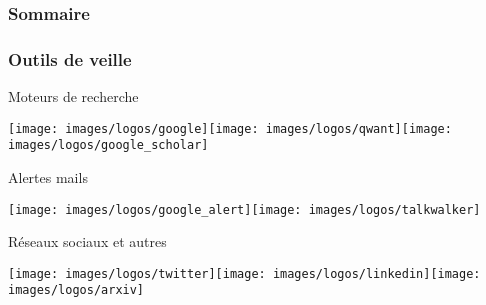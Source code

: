 \begin{frame}
	\frametitle{Sommaire}
	\tableofcontents
\end{frame}

\begin{frame}
	\frametitle{Outils de veille}
	\begin{itemize}
		\itemperso{}Moteurs de recherche\vspace*{.2cm}\newline%
		\rule{0pt}{0pt}\hfill\texttt{[image: images/logos/google]}\hspace{1cm}\texttt{[image: images/logos/qwant]}\hspace{1cm}\texttt{[image: images/logos/google\_scholar]}\hfill\rule{0pt}{0pt}
		\itemperso{}Alertes mails\vspace*{.2cm}\newline%
		\rule{0pt}{0pt}\hfill\texttt{[image: images/logos/google\_alert]}\hspace{1cm}\texttt{[image: images/logos/talkwalker]}\hfill\rule{0pt}{0pt}
		\itemperso{}Réseaux sociaux et autres\vspace*{.2cm}\newline%
		\rule{0pt}{0pt}\hfill\texttt{[image: images/logos/twitter]}\hspace{1cm}\texttt{[image: images/logos/linkedin]}\hspace{1cm}\texttt{[image: images/logos/arxiv]}\hfill\rule{0pt}{0pt}
	\end{itemize}
\end{frame}